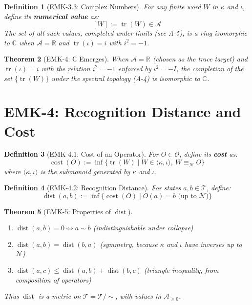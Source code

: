 \documentclass[12pt, oneside]{article}
\newtheorem{theorem}{Theorem}[section]
\newtheorem{definition}[theorem]{Definition}
\DeclareMathOperator{\tr}{tr}
\newcommand{\N}{\mathcal{N}}
\newcommand{\A}{\mathcal{A}}
\newcommand{\T}{\mathcal{T}}
\newcommand{\Opr}{\mathcal{O}}
\newcommand{\dist}{\mathop{\mathrm{dist}}}
\newcommand{\cost}{\mathop{\mathrm{cost}}}
\begin{document}
\begin{definition}[EMK-3.3: Complex Numbers]
For any finite word $W$ in $\kappa$ and $\iota$, define its \textbf{numerical value} as:
\[
[W] := \tr(W) \in \A
\]
The set of all such values, completed under limits (see A-5), is a ring isomorphic to $\mathbb{C}$ when $\A = \mathbb{R}$ and $\tr(\iota) = i$ with $i^2 = -1$.
\end{definition}

\begin{theorem}[EMK-4: $\mathbb{C}$ Emerges]
When $\A = \mathbb{R}$ (chosen as the trace target) and $\tr(\iota) = i$ with the relation $i^2 = -1$ enforced by $\iota^2 = -I$, the completion of the set $\{\tr(W)\}$ under the spectral topology (A-4) is isomorphic to $\mathbb{C}$.
\end{theorem}

\section{EMK-4: Recognition Distance and Cost}

\begin{definition}[EMK-4.1: Cost of an Operator]
For $O \in \Opr$, define its \textbf{cost} as:
\[
\cost(O) := \inf \{ \tr(W) \mid W \in \langle \kappa, \iota \rangle,\ W \equiv_\N O \}
\]
where $\langle \kappa, \iota \rangle$ is the submonoid generated by $\kappa$ and $\iota$.
\end{definition}

\begin{definition}[EMK-4.2: Recognition Distance]
For states $a, b \in \T$, define:
\[
\dist(a,b) := \inf \{ \cost(O) \mid O(a) = b \text{ (up to } \N\text{)} \}
\]
\end{definition}

\begin{theorem}[EMK-5: Properties of $\dist$]
\begin{enumerate}
    \item $\dist(a,b) = 0 \iff a \sim b$ (indistinguishable under collapse)
    \item $\dist(a,b) = \dist(b,a)$ (symmetry, because $\kappa$ and $\iota$ have inverses up to $\N$)
    \item $\dist(a,c) \le \dist(a,b) + \dist(b,c)$ (triangle inequality, from composition of operators)
\end{enumerate}
Thus $\dist$ is a metric on $\bar{\T} = \T/\!\sim$, with values in $\A_{\ge 0}$.
\end{theorem}
\end{document}

